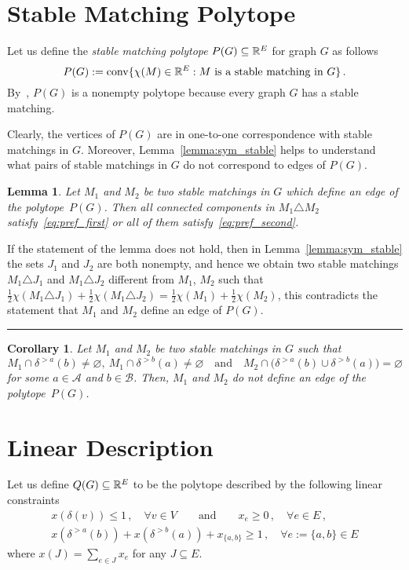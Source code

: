 \documentclass[preprint]{elsarticle}
\newtheorem{lemma}[fact]{Lemma}
\newtheorem{corollary}[fact]{Corollary}
\newenvironment{proof}{{\bf Proof:  }}{\hfill\rule{2mm}{2mm}}
\DeclareMathOperator{\convOp}{conv}
\newcommand{\conv}{\convOp}
\begin{document}
\section{Stable Matching Polytope}

Let us define the \emph{stable matching polytope} $P(G)\subseteq\mathbb{R}^E$ for graph $G$ as follows
$$
	P(G):=\conv\{\chi(M)\in\R^E: M \text{ is a stable matching in } G\}\,.
$$
By~\cite{gale1962college}, $P(G)$ is a nonempty polytope because every graph $G$ has a stable matching.

Clearly, the vertices of $P(G)$ are in one-to-one correspondence with stable matchings in $G$. Moreover, Lemma~\ref{lemma:sym_stable} helps to understand what pairs of stable matchings in $G$ do not correspond to edges of $P(G)$.

\begin{lemma}\label{lemma:edge}
Let $M_1$ and $M_2$ be two stable matchings in $G$ which define an edge of the polytope~$P(G)$. Then all connected components in $M_1\triangle M_2$ satisfy~\eqref{eq:pref_first} or all of them satisfy~\eqref{eq:pref_second}.  
\end{lemma}
\begin{proof}
If the statement of the lemma does not hold, then in Lemma~\ref{lemma:sym_stable} the sets $J_1$ and $J_2$ are both nonempty, and hence we obtain two stable matchings $M_1\triangle J_1$ and $M_1\triangle J_2$ different from $M_1$, $M_2$ such that $\frac{1}{2}\chi(M_1\triangle J_1)+\frac{1}{2}\chi(M_1\triangle J_2)=\frac{1}{2}\chi(M_1)+\frac{1}{2}\chi(M_2)$, this contradicts the statement that $M_1$ and $M_2$ define an edge of $P(G)$.
\end{proof}


\begin{corollary}\label{cor:edge}
Let $M_1$ and $M_2$ be two stable matchings in $G$ such that
$$
	M_1\cap\delta^{>a}(b)\neq\varnothing,\ M_1\cap\delta^{>b}(a)\neq\varnothing\quad\text{and}\quad M_2\cap\big(\delta^{>a}(b)\cup \delta^{>b}(a)\big)=\varnothing 
$$
 for some $a\in\mathcal{A}$ and $b\in\mathcal{B}$. Then, $M_1$ and $M_2$ do not define an edge of the polytope~$P(G)$.
\end{corollary}


\section{Linear Description}
Let us define $Q(G)\subseteq\mathbb{R}^E$ to be the polytope described  by the following linear constraints
\begin{align}
x(\delta(v)) \leq 1\,,\quad \forall v \in V\qquad \text{and} \qquad x_e \geq 0\,,\quad \forall e \in E\,,\label{eq:lin_descr_match}\\
x(\delta^{>a}(b))+ x(\delta^{>b}(a)) + x_{\{a,b\}} \geq 1\,, \quad \forall e:=\{a,b\} \in E \label{eq:lin_descr_stab}
\end{align}
where $x(J) = \sum_{e \in J} x_e$ for any $J \subseteq E$.
\end{document}
